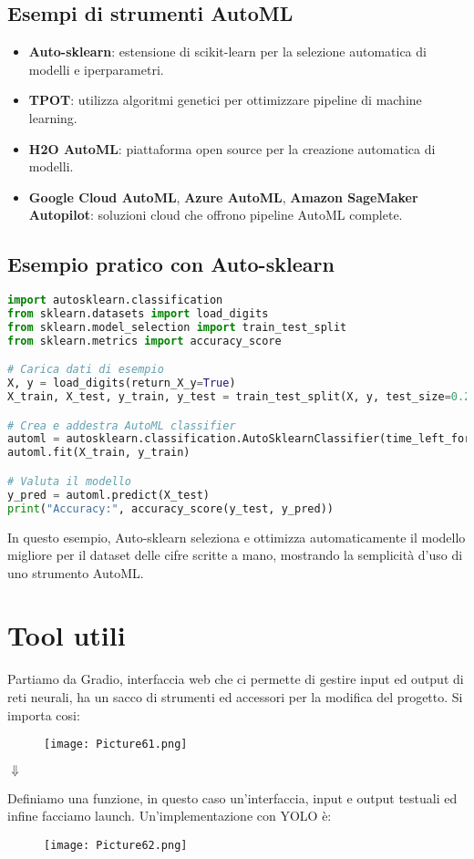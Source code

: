 \documentclass[a4paper,12pt]{article}
\begin{document}
\subsection{Esempi di strumenti AutoML}
\begin{itemize}
    \item \textbf{Auto-sklearn}: estensione di scikit-learn per la selezione automatica di modelli e iperparametri.
    \item \textbf{TPOT}: utilizza algoritmi genetici per ottimizzare pipeline di machine learning.
    \item \textbf{H2O AutoML}: piattaforma open source per la creazione automatica di modelli.
    \item \textbf{Google Cloud AutoML}, \textbf{Azure AutoML}, \textbf{Amazon SageMaker Autopilot}: soluzioni cloud che offrono pipeline AutoML complete.
\end{itemize}

\subsection{Esempio pratico con Auto-sklearn}
\begin{lstlisting}[language=Python, basicstyle=\ttfamily\footnotesize, breaklines=true, frame=single]
import autosklearn.classification
from sklearn.datasets import load_digits
from sklearn.model_selection import train_test_split
from sklearn.metrics import accuracy_score

# Carica dati di esempio
X, y = load_digits(return_X_y=True)
X_train, X_test, y_train, y_test = train_test_split(X, y, test_size=0.2)

# Crea e addestra AutoML classifier
automl = autosklearn.classification.AutoSklearnClassifier(time_left_for_this_task=60)
automl.fit(X_train, y_train)

# Valuta il modello
y_pred = automl.predict(X_test)
print("Accuracy:", accuracy_score(y_test, y_pred))
\end{lstlisting}

\noindent In questo esempio, Auto-sklearn seleziona e ottimizza automaticamente il modello migliore per il dataset delle cifre scritte a mano, mostrando la semplicità d'uso di uno strumento AutoML.

\section{Tool utili}
Partiamo da Gradio, interfaccia web che ci permette di gestire input ed output di reti neurali, ha un sacco di strumenti ed accessori per la modifica del progetto. 
Si importa cosi:
\begin{figure}[H]
    \centering
    \texttt{[image: Picture61.png]}
\end{figure}
\begin{center}
    $\Downarrow$
\end{center}
Definiamo una funzione, in questo caso un'interfaccia, input e output testuali ed infine facciamo launch. 
Un'implementazione con YOLO è:
\begin{figure}[H]
    \centering
    \texttt{[image: Picture62.png]}
\end{figure}
\end{document}
